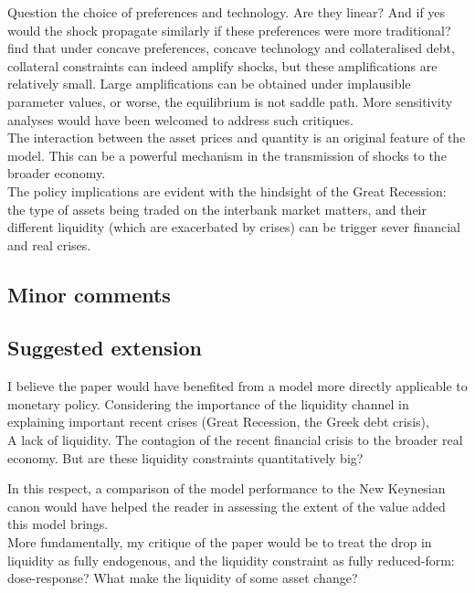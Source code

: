 \documentclass{amsart}
\theoremstyle{definition}
\theoremstyle{remark}
\numberwithin{equation}{section}
\begin{document}
Question the choice of preferences and technology. Are they linear? And if yes would the shock propagate similarly if these preferences were more traditional? \cite{cordoba2004credit} find that under concave preferences, concave technology and collateralised debt, collateral constraints can indeed amplify shocks, but these amplifications are relatively small. Large amplifications can be obtained under implausible parameter values, or worse, the equilibrium is not saddle path. More sensitivity analyses would have been welcomed to address such critiques.\\

The interaction between the asset prices and quantity is an original feature of the model. This can be a powerful mechanism in the transmission of shocks to the broader economy.\\

The policy implications are evident with the hindsight of the Great Recession: the type of assets being traded on the interbank market matters, and their different liquidity (which are exacerbated by crises) can be trigger sever financial and real crises.

\subsection*{Minor comments}

\subsection*{Suggested extension}

I believe the paper would have benefited from a model more directly applicable to monetary policy. Considering the importance of the liquidity channel in explaining important recent crises (Great Recession, the Greek debt crisis), \\

A lack of liquidity. The contagion of the recent financial crisis to the broader real economy. But are these liquidity constraints quantitatively big?

In this respect, a comparison of the model performance to the New Keynesian canon \citep{gali2015monetary} would have helped the reader in assessing the extent of the value added this model brings.\\

More fundamentally, my critique of the paper would be to treat the drop in liquidity as fully endogenous, and the liquidity constraint as fully reduced-form: dose-response? What make the liquidity of some asset change?\\
\end{document}
